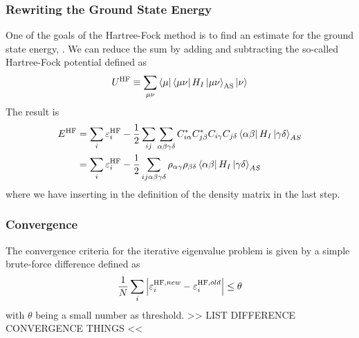     \subsubsection{Rewriting the Ground State Energy}
        One of the goals of the Hartree-Fock method is to find an estimate for
        the ground state energy, . We can reduce the sum by
        adding and subtracting the so-called Hartree-Fock potential defined as
            \begin{equation}
                U^{\text{HF}} \equiv \sum_{\mu\nu} \bra{\mu}\bra{\mu\nu} H_I
                \ket{\mu\nu}_{\text{AS}} \ket{\nu}
            \end{equation}
        The result is
            \begin{align}
                E^{\text{HF}} &= \sum_i\varepsilon^{\text{HF}}_i -
                \frac{1}{2}\sum_{ij}\sum_{\alpha\beta\gamma\delta}
                C^{*}_{i\alpha}C^{*}_{j\beta}C_{i\gamma}C_{j\delta}
                \bra{\alpha\beta}H_I\ket{\gamma\delta}_{AS} \nonumber \\
                &= \sum_{i} \varepsilon^{\text{HF}}_i -
                \frac{1}{2}\sum_{ij\alpha\beta\gamma\delta}
                \rho_{\alpha\gamma}\rho_{\beta\delta}
                \bra{\alpha\beta}H_I\ket{\gamma\delta}_{AS}
                \label{eq:rhoGroundState}
            \end{align}
        where we have inserting in the definition of the density matrix in the
        last step.

    \subsubsection{Convergence}
        The convergence criteria for the iterative eigenvalue problem is given
        by a simple brute-force difference defined as
            \begin{equation}
                \frac{1}{N}\sum_i\abs{\varepsilon^{\text{HF},new}_i -
                \varepsilon^{\text{HF},old}_i} \leq \theta
                \label{eq:conv}
            \end{equation}
        with $\theta$ being a small number as threshold. >> LIST DIFFERENCE
        CONVERGENCE THINGS <<

